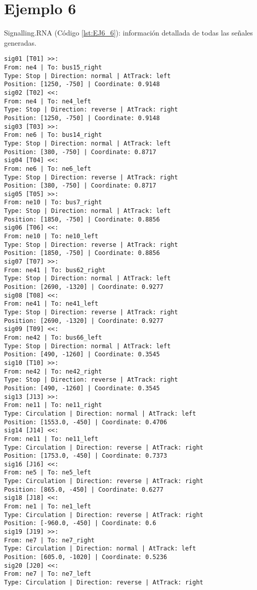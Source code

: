 	\section{Ejemplo 6}
	Signalling.RNA (Código \ref{lst:EJ6_6}): información detallada de todas las señales generadas.
	
	\begin{lstlisting}[language = {}, caption = Signalling.RNA, label = {lst:EJ6_6}]
sig01 [T01] >>:
From: ne4 | To: bus15_right
Type: Stop | Direction: normal | AtTrack: left 
Position: [1250, -750] | Coordinate: 0.9148
sig02 [T02] <<:
From: ne4 | To: ne4_left
Type: Stop | Direction: reverse | AtTrack: right 
Position: [1250, -750] | Coordinate: 0.9148
sig03 [T03] >>:
From: ne6 | To: bus14_right
Type: Stop | Direction: normal | AtTrack: left 
Position: [380, -750] | Coordinate: 0.8717
sig04 [T04] <<:
From: ne6 | To: ne6_left
Type: Stop | Direction: reverse | AtTrack: right 
Position: [380, -750] | Coordinate: 0.8717
sig05 [T05] >>:
From: ne10 | To: bus7_right
Type: Stop | Direction: normal | AtTrack: left 
Position: [1850, -750] | Coordinate: 0.8856
sig06 [T06] <<:
From: ne10 | To: ne10_left
Type: Stop | Direction: reverse | AtTrack: right 
Position: [1850, -750] | Coordinate: 0.8856
sig07 [T07] >>:
From: ne41 | To: bus62_right
Type: Stop | Direction: normal | AtTrack: left 
Position: [2690, -1320] | Coordinate: 0.9277
sig08 [T08] <<:
From: ne41 | To: ne41_left
Type: Stop | Direction: reverse | AtTrack: right 
Position: [2690, -1320] | Coordinate: 0.9277
sig09 [T09] <<:
From: ne42 | To: bus66_left
Type: Stop | Direction: normal | AtTrack: left 
Position: [490, -1260] | Coordinate: 0.3545
sig10 [T10] >>:
From: ne42 | To: ne42_right
Type: Stop | Direction: reverse | AtTrack: right 
Position: [490, -1260] | Coordinate: 0.3545
sig13 [J13] >>:
From: ne11 | To: ne11_right
Type: Circulation | Direction: normal | AtTrack: left 
Position: [1553.0, -450] | Coordinate: 0.4706
sig14 [J14] <<:
From: ne11 | To: ne11_left
Type: Circulation | Direction: reverse | AtTrack: right 
Position: [1753.0, -450] | Coordinate: 0.7373
sig16 [J16] <<:
From: ne5 | To: ne5_left
Type: Circulation | Direction: reverse | AtTrack: right 
Position: [865.0, -450] | Coordinate: 0.6277
sig18 [J18] <<:
From: ne1 | To: ne1_left
Type: Circulation | Direction: reverse | AtTrack: right 
Position: [-960.0, -450] | Coordinate: 0.6
sig19 [J19] >>:
From: ne7 | To: ne7_right
Type: Circulation | Direction: normal | AtTrack: left 
Position: [605.0, -1020] | Coordinate: 0.5236
sig20 [J20] <<:
From: ne7 | To: ne7_left
Type: Circulation | Direction: reverse | AtTrack: right 

\end{lstlisting}
